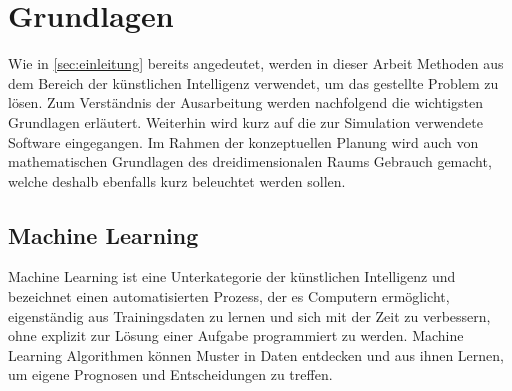 \chapter{Grundlagen}
Wie in \autoref{sec:einleitung} bereits angedeutet, werden in dieser Arbeit Methoden aus dem Bereich der künstlichen Intelligenz verwendet, um das gestellte Problem zu lösen.
Zum Verständnis der Ausarbeitung werden nachfolgend die wichtigsten Grundlagen erläutert.
Weiterhin wird kurz auf die zur Simulation verwendete Software eingegangen.
Im Rahmen der konzeptuellen Planung wird auch von mathematischen Grundlagen des dreidimensionalen Raums Gebrauch gemacht, welche deshalb ebenfalls kurz beleuchtet werden sollen.

\section{Machine Learning}
Machine Learning ist eine Unterkategorie der künstlichen Intelligenz und bezeichnet einen automatisierten Prozess, der es Computern ermöglicht, eigenständig aus Trainingsdaten zu lernen und sich mit der Zeit zu verbessern, ohne explizit zur Lösung einer Aufgabe programmiert zu werden.
Machine Learning Algorithmen können Muster in Daten entdecken und aus ihnen Lernen, um eigene Prognosen und Entscheidungen zu treffen.

